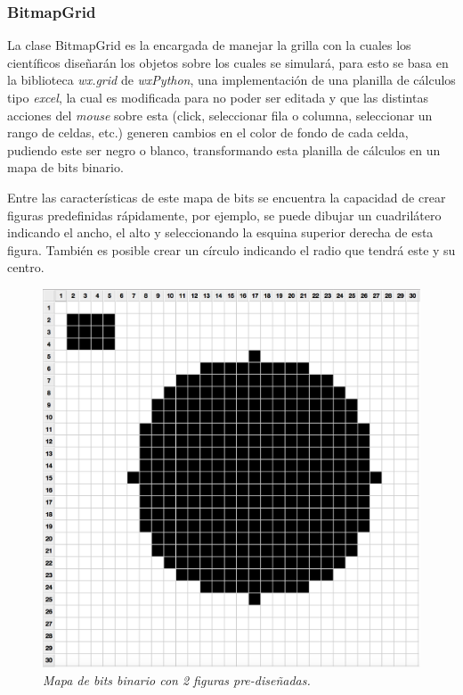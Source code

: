 \subsubsection{BitmapGrid}
La clase BitmapGrid es la encargada de manejar la grilla con la cuales los científicos diseñarán los objetos sobre los cuales se simulará, para esto se basa en la biblioteca \emph{wx.grid} de \emph{wxPython}, una implementación de una planilla de cálculos tipo \emph{excel}, la cual es modificada para no poder ser editada y que las distintas acciones del \emph{mouse} sobre esta (click, seleccionar fila o columna, seleccionar un rango de celdas, etc.) generen cambios en el color de fondo de cada celda, pudiendo este ser negro o blanco, transformando esta planilla de cálculos en un mapa de bits binario.

Entre las características de este mapa de bits se encuentra la capacidad de crear figuras predefinidas rápidamente, por ejemplo, se puede dibujar un cuadrilátero indicando el ancho, el alto y seleccionando la esquina superior derecha de esta figura. También es posible crear un círculo indicando el radio que tendrá este y su centro.

\begin{figure}[H]
  \centering
  \includegraphics[scale=.5]{images/bitmapGrid}
  \caption{\em Mapa de bits binario con 2 figuras pre-diseñadas.}
\end{figure}

